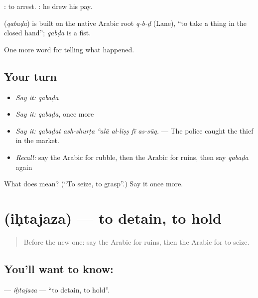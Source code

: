  : to arrest.  : he drew his pay.

\begin{cousinweb}
\textbf{} (\emph{qabaḍa}) is built on the native Arabic root \emph{q-b-ḍ} (Lane), \textquotedblleft{}to take a thing in the closed hand\textquotedblright{}; \emph{qabḍa} is a fist.
\end{cousinweb}

\begin{grammarlens}[title={What you've built}]
One more word for telling what happened.
\end{grammarlens}

\subsection*{Your turn}
\begin{itemize}
\raggedright
  \item \emph{Say it:} \emph{qabaḍa}
  \item \emph{Say it:} \emph{qabaḍa}, once more
  \item \emph{Say it:} \emph{qabaḍat ash-shurṭa ʿalā al-liṣṣ fī as-sūq.} — The police caught the thief in the market.
  \item \emph{Recall:} say the Arabic for rubble, then the Arabic for ruins, then say \emph{qabaḍa} again
\end{itemize}

\begin{tcolorbox}[breakable,colback=teal!4,colframe=teal!35!black,title={Before you move on}]
What does  mean? (\textquotedblleft{}To seize, to grasp\textquotedblright{}.) Say it once more.
\end{tcolorbox}
\section[\texorpdfstring{\ar{احتجز} (iḥtajaza)}{احتجز (iḥtajaza)}]{ (iḥtajaza) — to detain, to hold}

\label{lesson:AR-C317-ihtajaza}



\begin{quote}
Before the new one: say the Arabic for ruins, then the Arabic for to seize.
\end{quote}

\subsection*{You'll want to know: }
\textbf{} — \emph{iḥtajaza} — \textquotedblleft{}to detain, to hold\textquotedblright{}.

